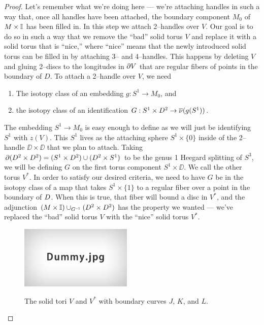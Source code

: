 \begin{proof}
	Let's remember what we're doing here --- we're attaching handles in such a way that, once all handles have been attached, the boundary component $M_0$ of $M\times\mathbb{I}$ has been filled in.
	In this step we attach 2--handles over $V$.
	Our goal is to do so in such a way that we remove the ``bad'' solid torus $V$ and replace it with a solid torus that is ``nice,'' where ``nice'' means that the newly introduced solid torus can be filled in by attaching 3-- and 4--handles.
	This happens by deleting $V$ and gluing 2--discs to the longitudes in $\partial V$ that are regular fibers of points in the boundary of $D$.
	To attach a 2--handle over $V$, we need
	\begin{enumerate}
		\item The isotopy class of an embedding $g:S^1\to M_0$, and
		\item the isotopy class of an identification $G:S^1\times D^2\to\overline{\nu}(g(S^1))$.
	\end{enumerate}
	The embedding $S^1\to M_0$ is easy enough to define as we will just be identifying $S^1$ with $z(V)$.
	This $S^1$ lives as the attaching sphere $S^1\times\{0\}$ inside of the 2--handle $\DD\times\DD$ that we plan to attach.
	Taking $\partial (D^2\times D^2)=(S^1\times D^2)\cup(D^2\times S^1)$ to be the genus 1 Heegard splitting of $S^3$, we will be defining $G$ on the first torus component $S^1\times\DD$.
	We call the other torus $V^*$.
	In order to satisfy our desired criteria, we need to have $G$ be in the isotopy class of a map that takes $S^1\times\{1\}$ to a regular fiber over a point in the boundary of $D$.
	When this is true, that fiber will bound a disc in $V^*$, and the adjunction $(M\times\mathbb{I})\cup_{G^{\,\text{-}1}}(D^2\times D^2)$ has the property we wanted --- we've replaced the ``bad'' solid torus $V$ with the ``nice'' solid torus $V^*$.
	
	\begin{figure}
		\centering
		\captionsetup{justification=centering}
		\caption{The solid tori $V$ and $V^*$ with boundary curves $J$, $K$, and $L$.}
		\includegraphics[height=3cm]{figures/dummy.jpg}
		\label{fig:VV*}
	\end{figure}
	

\end{proof}
